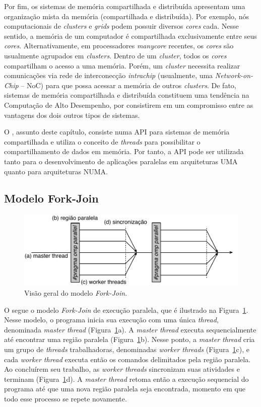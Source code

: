 \documentclass{SBCbookchapter}
\begin{document}
		Por fim, os sistemas de memória compartilhada e distribuída
		apresentam uma organização mista da memória (compartilhada e
		distribuída). Por exemplo, nós computacionais de
		\textit{clusters} e \textit{grids} podem possuir diversos
		\textit{cores} cada. Nesse sentido, a memória de um computador é
		compartilhada exclusivamente entre seus \textit{cores}.
		Alternativamente, em processadores \textit{manycore} recentes,
		os \textit{cores} são usualmente agrupados em \textit{clusters}.
		Dentro de um \textit{cluster}, todos os \textit{cores}
		compartilham o acesso a uma memória.  Porém, um \textit{cluster}
		necessita realizar comunicações via rede de interconecção
		\textit{intrachip} (usualmente, uma \textit{Network-on-Chip} --
		NoC) para que possa acessar a memória de outros
		\textit{clusters}. De fato, sistemas de memória compartilhada e
		distribuída constituem uma tendência na Computação de Alto
		Desempenho, por consistirem em um compromisso entre as vantagens
		dos dois outros tipos de sistemas.

		O \openmp, assunto deste capítulo, consiste numa API para
		sistemas de memória compartilhada e utiliza o conceito de
		\textit{threads} para possibilitar o compartilhamento de dados
		em memória. Por tanto, a API pode ser utilizada tanto para o
		desenvolvimento de aplicações paralelas em arquiteturas UMA
		quanto para arquiteturas NUMA.
		
	\subsection{Modelo Fork-Join}

		\begin{figure}[b]
			\centering
			\includegraphics[width=0.8\linewidth]{img/fork-join}
			\caption{Visão geral do modelo \textit{Fork-Join}.}\label{fig:fork-join}
		\end{figure}

		O \openmp segue o modelo \textit{Fork-Join} de execução paralela, que é
		ilustrado na Figura~\ref{fig:fork-join}. Nesse modelo, o
		programa inicia sua execução com uma única \textit{thread},
		denominada \textit{master thread} (Figura~\ref{fig:fork-join}a).
		A \textit{master thread} executa sequencialmente até encontrar
		uma região paralela (Figura~\ref{fig:fork-join}b). Nesse ponto,
		a \textit{master thread} cria um grupo de \textit{threads}
		trabalhadoras, denominadas \textit{worker threads}
		(Figura~\ref{fig:fork-join}c), e cada \textit{worker thread}
		executa então os comandos delimitados pela região paralela. Ao
		concluírem seu trabalho, as \textit{worker threads} sincronizam
		suas atividades e terminam (Figura~\ref{fig:fork-join}d). A
		\textit{master thread} retoma então a execução sequencial do
		programa até que uma nova região paralela seja encontrada,
		momento em que todo esse processo se repete novamente.
		
\end{document}
